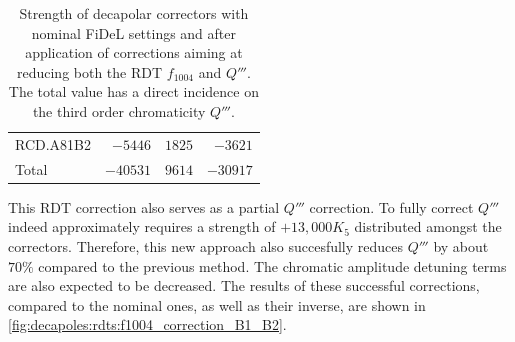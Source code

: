 \begin{table}[!htb]
\begin{tabular}{lrrr}
    \hspace{2mm}RCD.A81B2 &$-5446$ & $1825 $ &  $-3621 $\\
    \hspace{2mm}Total     &$-40531$& $9614 $ &  $-30917$      \\
    \bottomrule
    \end{tabular}
    \caption{Strength of decapolar correctors with nominal FiDeL settings and after application of
    corrections aiming at reducing both the RDT $f_{1004}$ and $Q'''$. The total value has a direct
    incidence on the third order chromaticity $Q'''$.}
    \label{tab:decapoles:rdts:correction_f1004_k5}
\end{table}

This RDT correction also serves as a partial $Q'''$ correction. To fully correct $Q'''$ indeed
approximately requires a strength of $+13,000 K_5$ distributed amongst the correctors. Therefore,
this new approach also succesfully reduces $Q'''$ by about $70\%$ compared to the previous method.
The chromatic amplitude detuning terms are also expected to be decreased.
The results of these successful corrections, compared to the nominal ones, as well as their inverse,
are shown in \cref{fig:decapoles:rdts:f1004_correction_B1_B2}.

